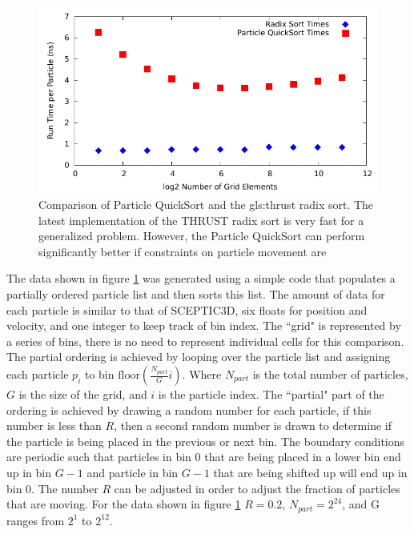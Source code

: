 \begin{figure}
\begin{center}
\includegraphics[width=5in]{design/sort_compare.pdf}
\end{center}
\caption[Comparison of Particle QuickSort and the \gls{gls:thrust} radix sort.]{Comparison of Particle QuickSort and the \gls{gls:thrust} radix sort. The latest implementation of the THRUST radix sort is very fast for a generalized problem. However, the Particle QuickSort can perform significantly better if constraints on particle movement are }
\label{fig:stantchev_sort_compare}
\end{figure}

The data shown in figure \ref{fig:stantchev_sort_compare} was generated using a simple code that populates a partially ordered particle list and then sorts this list. The amount of data for each particle is similar to that of SCEPTIC3D, six floats for position and velocity, and one integer to keep track of bin index. The ``grid" is represented by a series of bins, there is no need to represent individual cells for this comparison. The partial ordering is achieved by looping over the particle list and assigning each particle $p_i$ to bin $\mathrm{floor}(\frac{N_{part}}{G} i)$. Where $N_{part}$ is the total number of particles, $G$ is the size of the grid, and $i$ is the particle index. The ``partial" part of the ordering is achieved by drawing a random number for each particle, if this number is less than $R$, then a second random number is drawn to determine if the particle is being placed in the previous or next bin. The boundary conditions are periodic such that particles in bin 0 that are being placed in a lower bin end up in bin $G-1$ and particle in bin $G-1$ that are being shifted up will end up in bin 0. The number $R$ can be adjusted in order to adjust the fraction of particles that are moving. For the data shown in figure \ref{fig:stantchev_sort_compare} $R = 0.2$, $N_{part} = 2^{24}$, and G ranges from $2^1$ to $2^{12}$. 

